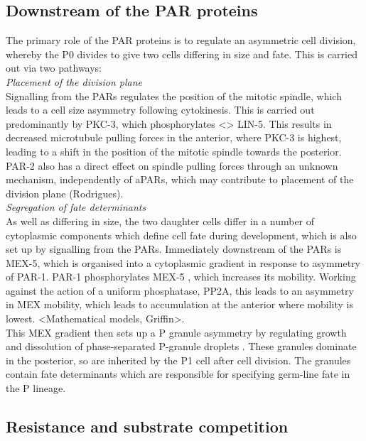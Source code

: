 \documentclass[12pt]{"report"}
\begin{document}
\subsection{Downstream of the PAR proteins}

The primary role of the PAR proteins is to regulate an asymmetric cell division, whereby the P0 divides to give two cells differing in size and fate. This is carried out via two pathways:\\

\textit{Placement of the division plane}\\

Signalling from the PARs regulates the position of the mitotic spindle, which leads to a cell size asymmetry following cytokinesis. This is carried out predominantly by PKC-3, which phosphorylates <> LIN-5. This results in decreased microtubule pulling forces in the anterior, where PKC-3 is highest, leading to a shift in the position of the mitotic spindle towards the posterior. PAR-2 also has a direct effect on spindle pulling forces through an unknown mechanism, independently of aPARs, which may contribute to placement of the division plane (Rodrigues).\\


\textit{Segregation of fate determinants}\\

As well as differing in size, the two daughter cells differ in a number of cytoplasmic components which define cell fate during development, which is also set up by signalling from the PARs. Immediately downstream of the PARs is MEX-5, which is organised into a cytoplasmic gradient in response to asymmetry of PAR-1. PAR-1 phosphorylates MEX-5 \citep{Griffin2011}, which increases its mobility. Working against the action of a uniform phosphatase, PP2A, this leads to an asymmetry in MEX mobility, which leads to accumulation at the anterior where mobility is lowest. <Mathematical models, Griffin>. \\

This MEX gradient then sets up a P granule asymmetry by regulating growth and dissolution of phase-separated P-granule droplets \citep{Brangwynne2009}. These granules dominate in the posterior, so are inherited by the P1 cell after cell division. The granules contain fate determinants which are responsible for specifying germ-line fate in the P lineage.\\


\subsection{Resistance and substrate competition}
\end{document}
